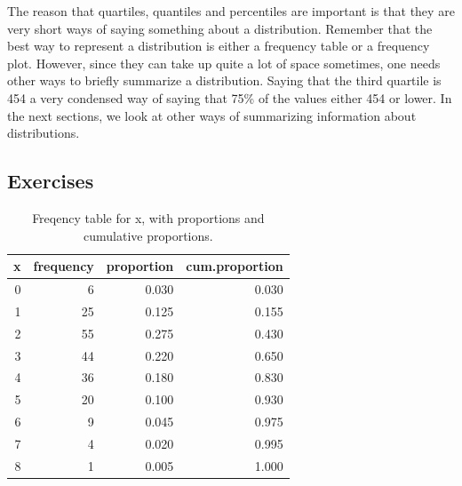 \documentclass[]{report}\usepackage[]{graphicx}\usepackage[]{color}
\begin{document}
The reason that quartiles, quantiles and percentiles are important is that they are very short ways of saying something about a distribution. Remember that the best way to represent a distribution is either a frequency table or a frequency plot. However, since they can take up quite a lot of space sometimes, one needs other ways to briefly summarize a distribution. Saying that the third quartile is 454 a very condensed way of saying that 75\% of the values either 454 or lower. In the next sections, we look at other ways of summarizing information about distributions.

\subsection{Exercises}

\begin{table}[ht]
\centering
\caption{Freqency table for x, with proportions and cumulative proportions.} 
\label{tab:frequency_2}
\begin{tabular}{rrrr}
  \hline
x & frequency & proportion & cum.proportion \\ 
  \hline
   0 &    6 & 0.030 & 0.030 \\ 
     1 &   25 & 0.125 & 0.155 \\ 
     2 &   55 & 0.275 & 0.430 \\ 
     3 &   44 & 0.220 & 0.650 \\ 
     4 &   36 & 0.180 & 0.830 \\ 
     5 &   20 & 0.100 & 0.930 \\ 
     6 &    9 & 0.045 & 0.975 \\ 
     7 &    4 & 0.020 & 0.995 \\ 
     8 &    1 & 0.005 & 1.000 \\ 
   \hline
\end{tabular}
\end{table}
\end{document}
